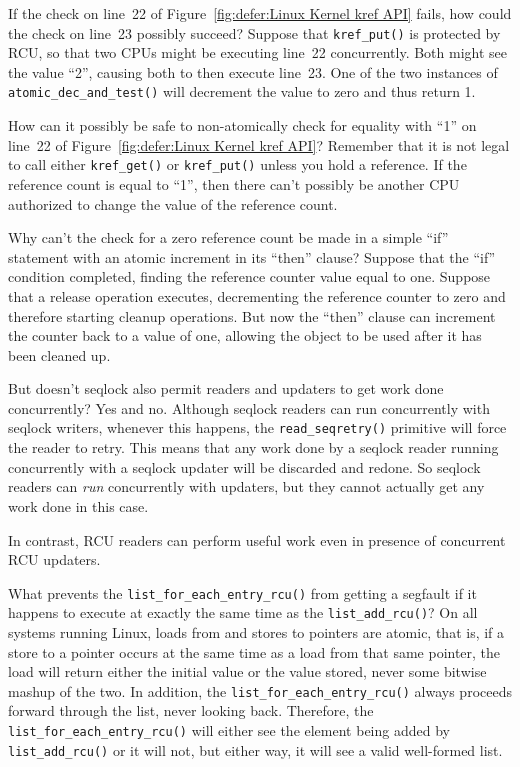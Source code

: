 \QuickQ{}
	If the check on line~22 of
	Figure~\ref{fig:defer:Linux Kernel kref API} fails, how
	could the check on line~23 possibly succeed?
\QuickA{}
	Suppose that {\tt kref\_put()} is protected by RCU, so
	that two CPUs might be executing line~22 concurrently.
	Both might see the value ``2'', causing both to then
	execute line~23.
	One of the two instances of {\tt atomic\_dec\_and\_test()}
	will decrement the value to zero and thus return 1.

\QuickQ{}
	How can it possibly be safe to non-atomically check for equality
	with ``1'' on line~22 of
	Figure~\ref{fig:defer:Linux Kernel kref API}?
\QuickA{}
	Remember that it is not legal to call either {\tt kref\_get()}
	or {\tt kref\_put()} unless you hold a reference.
	If the reference count is equal to ``1'', then there
	can't possibly be another CPU authorized to change the
	value of the reference count.

\QuickQ{}
	Why can't the check for a zero reference count be
	made in a simple ``if'' statement with an atomic
	increment in its ``then'' clause?
\QuickA{}
	Suppose that the ``if'' condition completed, finding
	the reference counter value equal to one.
	Suppose that a release operation executes, decrementing
	the reference counter to zero and therefore starting
	cleanup operations.
	But now the ``then'' clause can increment the counter
	back to a value of one, allowing the object to be
	used after it has been cleaned up.

\QuickQ{}
	But doesn't seqlock also permit readers and updaters to get
	work done concurrently?
\QuickA{}
	Yes and no.
	Although seqlock readers can run concurrently with
	seqlock writers, whenever this happens, the {\tt read\_seqretry()}
	primitive will force the reader to retry.
	This means that any work done by a seqlock reader running concurrently
	with a seqlock updater will be discarded and redone.
	So seqlock readers can \emph{run} concurrently with updaters,
	but they cannot actually get any work done in this case.

	In contrast, RCU readers can perform useful work even in presence
	of concurrent RCU updaters.

\QuickQ{}
	What prevents the {\tt list\_for\_each\_entry\_rcu()} from
	getting a segfault if it happens to execute at exactly the same
	time as the {\tt list\_add\_rcu()}?
\QuickA{}
	On all systems running Linux, loads from and stores
	to pointers are atomic, that is, if a store to a pointer occurs at
	the same time as a load from that same pointer, the load will return
	either the initial value or the value stored, never some bitwise
	mashup of the two.
	In addition, the {\tt list\_for\_each\_entry\_rcu()} always proceeds
	forward through the list, never looking back.
	Therefore, the {\tt list\_for\_each\_entry\_rcu()} will either see
	the element being added by {\tt list\_add\_rcu()} or it will not,
	but either way, it will see a valid well-formed list.

